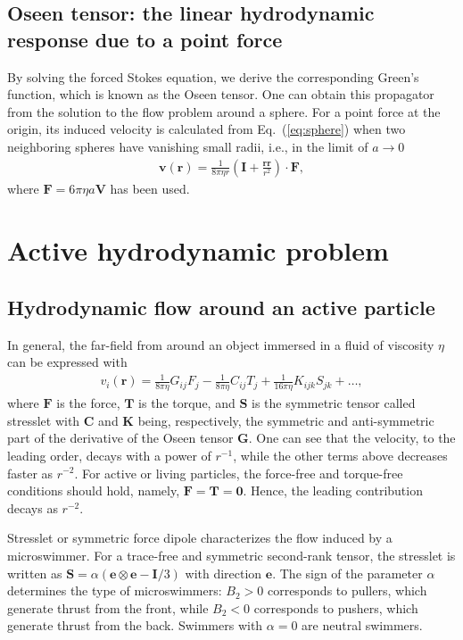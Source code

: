 \subsection{Oseen tensor: the linear hydrodynamic response due to a point force}


By solving the forced Stokes equation, we derive the corresponding Green's function, which is known as the Oseen tensor.
One can obtain this propagator from the solution to the flow problem around a sphere.
For a point force at the origin, its induced velocity is calculated from Eq.~(\ref{eq:sphere}) when two neighboring spheres have vanishing small radii, i.e., in the limit of $a\to0$
\begin{align}
    \mathbf{v}(\mathbf{r})
    =
    \frac{1}{8\pi\eta r}
    \left(
    \mathbf{I} +\frac{\mathbf{rr}}{r^2}
    \right)
    \cdot
    \mathbf{F},
\end{align}
where $\mathbf{F}= 6\pi\eta a \mathbf{V}$ has been used.


\section{Active hydrodynamic problem}


\subsection{Hydrodynamic flow around an active particle}


In general, the far-field from around an object immersed in a fluid of viscosity $\eta$ can be expressed with
\begin{align}
    v_i(\mathbf{r})
    =
    \frac{1}{8\pi\eta}G_{ij}F_j
    -
    \frac{1}{8\pi\eta}C_{ij}T_j
    +
    \frac{1}{16\pi\eta}
    K_{ijk}S_{jk}
    +\dots,
\end{align}
where $\mathbf{F}$ is the force, $\mathbf{T}$ is the torque, and $\mathbf{S}$ is the symmetric tensor called stresslet with $\mathbf{C}$ and $\mathbf{K}$ being, respectively, the symmetric and anti-symmetric part of the derivative of the Oseen tensor $\mathbf{G}$.
One can see that the velocity, to the leading order, decays with a power of $r^{-1}$, while the other terms above decreases faster as $r^{-2}$.
For active or living particles, the force-free and torque-free conditions should hold, namely, $\mathbf{F}=\mathbf{T}=\mathbf{0}$. Hence, the leading contribution decays as $r^{-2}$.

Stresslet or symmetric force dipole characterizes the flow induced by a microswimmer. 
For a trace-free and symmetric second-rank tensor, the stresslet is written as $\mathbf{S}=\alpha(\mathbf{e}\otimes\mathbf{e}-\mathbf{I}/3)$ with direction $\mathbf{e}$.
The sign of the parameter $\alpha$ determines the type of microswimmers: $B_2 > 0$ corresponds to pullers, which generate thrust from the front, while $B_2 < 0$ corresponds to pushers, which generate thrust from the back. Swimmers with $\alpha=0$ are neutral swimmers.



